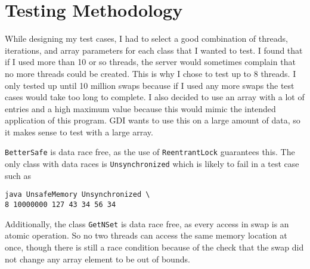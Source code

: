 \documentclass[letterpaper,twocolumn,10pt]{article}
\begin{document}
\section{Testing Methodology}

While designing my test cases, I had to select a good combination of threads, iterations, and array parameters for each class that I wanted to test. I found that if I used more than
10 or so threads, the server would sometimes complain that no more threads could be created. This is why I chose to test up to 8 threads. I only tested up until 10 million swaps
because if I used any more swaps the test cases would take too long to complete. I also decided to use an array with a lot of entries and a high maximum value because this would
mimic the intended application of this program. GDI wants to use this on a large amount of data, so it makes sense to test with a large array.

\texttt{BetterSafe} is data race free, as the use of \texttt{ReentrantLock} guarantees this. The only class with data races is \texttt{Unsynchronized} which is likely to fail in
a test case such as
\begin{verbatim}
java UnsafeMemory Unsynchronized \
8 10000000 127 43 34 56 34
\end{verbatim}
Additionally, the class \texttt{GetNSet} is data race free, as every access in swap is an atomic operation. So no two threads can access the same memory location at once, though
there is still a race condition because of the check that the swap did not change any array element to be out of bounds.
\end{document}
